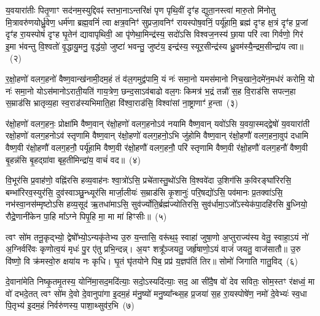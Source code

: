 य॒वयारा॑तीः पितृ॒णाꣳ सद॑नम॒स्युद्दिवꣴ॑ स्तभा॒ना\-ऽन्तरि॑क्षं पृण पृथि॒वीं दृꣳ॑ह द्युता॒नस्त्वा॑ मारु॒तो मि॑नोतु मि॒त्रावरु॑णयोर्ध्रु॒वेण॒ धर्म॑णा ब्रह्म॒वनिं॑ त्वा क्षत्र॒वनिꣳ॑ सुप्रजा॒वनिꣳ॑ रायस्पोष॒वनिं॒ पर्यू॑हामि॒ ब्रह्म॑ दृꣳह क्ष॒त्रं दृꣳ॑ह प्र॒जां दृꣳ॑ह रा॒यस्पोषं॑ दृꣳह घृ॒तेन॑ द्यावा\-पृथिवी॒ आ पृ॑णेथा॒मिन्द्र॑स्य॒ सदो॑\-ऽसि विश्वज॒नस्य॑ छा॒या परि॑ त्वा गिर्वणो॒ गिर॑ इ॒मा भ॑वन्तु वि॒श्वतो॑ वृ॒द्धायु॒मनु॒ वृद्ध॑यो॒ जुष्टा॑ भवन्तु॒ जुष्ट॑य॒ इन्द्र॑स्य॒ स्यूर॒सीन्द्र॑स्य ध्रु॒वम॑स्यै॒न्द्रम॒सीन्द्रा॑य त्वा॥~(२)

{\anuvakamend[{द्वेष॑ इ॒मा अ॒ष्टाद॑श च}]}%

र॒क्षो॒हणो॑ वलग॒हनो॑ वैष्ण॒वान्ख॑नामी॒दम॒हं तं व॑ल॒गमुद्व॑पामि॒ यं नः॑ समा॒नो यमस॑मानो निच॒खाने॒दमे॑न॒मध॑रं करोमि॒ यो नः॑ समा॒नो यो\-ऽस॑मानो\-ऽराती॒यति॑ गाय॒त्रेण॒ छन्द॒सा\-ऽव॑बाढो वल॒गः किमत्र॑ भ॒द्रं तन्नौ॑ स॒ह वि॒राड॑सि सपत्न॒हा स॒म्राड॑सि भ्रातृव्य॒हा स्व॒राड॑स्यभिमाति॒हा वि॑श्वा॒राड॑सि॒ विश्वा॑सां ना॒ष्ट्राणाꣳ॑ ह॒न्ता~(३)

र॑क्षो॒हणो॑ वलग॒हनः॒ प्रोक्षा॑मि वैष्ण॒वान् र॑क्षो॒हणो॑ वलग॒हनो\-ऽव॑ नयामि वैष्ण॒वान् यवो॑\-ऽसि य॒वया॒स्मद्द्वेषो॑ य॒वयारा॑ती रक्षो॒हणो॑ वलग॒हनो\-ऽव॑ स्तृणामि वैष्ण॒वान् र॑क्षो॒हणो॑ वलग॒हनो॒\-ऽभि जु॑होमि वैष्ण॒वान् र॑क्षो॒हणौ॑ वलग॒हना॒वुप॑ दधामि वैष्ण॒वी र॑क्षो॒हणौ॑ वलग॒हनौ॒ पर्यू॑हामि वैष्ण॒वी र॑क्षो॒हणौ॑ वलग॒हनौ॒ परि॑ स्तृणामि वैष्ण॒वी र॑क्षो॒हणौ॑ वलग॒हनौ॑ वैष्ण॒वी बृ॒हन्न॑सि बृ॒हद्ग्रा॑वा बृह॒तीमिन्द्रा॑य॒ वाचं॑ वद॥~(४)

{\anuvakamend[{ह॒न्तेन्द्रा॑य॒ द्वे च॑}]}%

वि॒भूर॑सि प्र॒वाह॑णो॒ वह्नि॑रसि हव्य॒वाह॑नः श्वा॒त्रो॑\-ऽसि॒ प्रचे॑तास्तु॒थो॑\-ऽसि वि॒श्ववे॑दा उ॒शिग॑सि क॒विरङ्घा॑रिरसि॒ बम्भा॑रिरव॒स्युर॑सि॒ दुव॑स्वाञ्छु॒न्ध्यूर॑सि मार्जा॒लीयः॑ स॒म्राड॑सि कृ॒शानुः॑ परि॒षद्यो॑\-ऽसि॒ पव॑मानः प्र॒तक्वा॑\-ऽसि॒ नभ॑स्वा॒नस॑म्मृष्टो\-ऽसि हव्य॒सूद॑ ऋ॒तधा॑मा\-ऽसि॒ सुव॑र्ज्योति॒र्ब्रह्म॑ज्योतिरसि॒ सुव॑र्धामा॒\-ऽजो᳚\-ऽस्येक॑पा॒दहि॑रसि बु॒ध्नियो॒ रौद्रे॒णानी॑केन पा॒हि मा᳚\-ऽग्ने पिपृ॒हि मा॒ मा मा॑ हिꣳसीः॥~(५)

{\anuvakamend[{अनी॑केना॒ष्टौ च॑}]}%

त्वꣳ सो॑म तनू॒कृद्भ्यो॒ द्वेषो᳚भ्यो॒\-ऽन्यकृ॑तेभ्य उ॒रु य॒न्तासि॒ वरू॑थ॒ꣴ॒ स्वाहा॑ जुषा॒णो अ॒प्तुराज्य॑स्य वेतु॒ स्वाहा॒\-ऽयं नो॑ अ॒ग्निर्वरि॑वः कृणोत्व॒यं मृधः॑ पु॒र ए॑तु प्रभि॒न्दन्न्। अ॒यꣳ शत्रू᳚ञ्जयतु॒ जर्\mbox{}हृ॑षाणो॒\-ऽयं वाजं॑ जयतु॒ वाज॑सातौ॥ उ॒रु वि॑ष्णो॒ वि क्र॑मस्वो॒रु क्षया॑य नः कृधि। घृ॒तं घृ॑तयोने पिब॒ प्रप्र॑ य॒ज्ञप॑तिं तिर॥ सोमो॑ जिगाति गातु॒विद्~(६)

दे॒वाना॑मेति निष्कृ॒तमृ॒तस्य॒ योनि॑मा॒सद॒मदि॑त्याः॒ सदो॒\-ऽस्यदि॑त्याः॒ सद॒ आ सी॑दै॒ष वो॑ देव सवितः॒ सोम॒स्तꣳ र॑क्षध्वं॒ मा वो॑ दभदे॒तत् त्वꣳ सो॑म दे॒वो दे॒वानुपा॑गा इ॒दम॒हं म॑नु॒ष्यो॑ मनु॒ष्या᳚न्थ्स॒ह प्र॒जया॑ स॒ह रा॒यस्पोषे॑ण॒ नमो॑ दे॒वेभ्यः॑ स्व॒धा पि॒तृभ्य॑ इ॒दम॒हं निर्वरु॑णस्य॒ पाशा॒थ्सुव॑र॒भि~(७)

